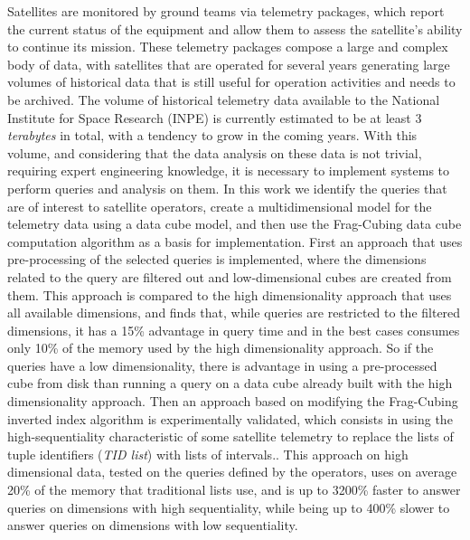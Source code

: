 
\begin{resumo}

\hypertarget{estilo:resumo}{} %

Satellites are monitored by ground teams via telemetry packages, which report the current status of the equipment and allow them to assess the satellite's ability to continue its mission.
These telemetry packages compose a large and complex body of data, with satellites that are operated for several years generating large volumes of historical data that is still useful for operation activities and needs to be archived.
The volume of historical telemetry data available to the National Institute for Space Research (INPE) is currently estimated to be at least 3 \textit{terabytes} in total, with a tendency to grow in the coming years.
With this volume, and considering that the data analysis on these data is not trivial, requiring expert engineering knowledge, it is necessary to implement systems to perform queries and analysis on them.
In this work we identify the queries that are of interest to satellite operators, create a multidimensional model for the telemetry data using a data cube model, and then use the Frag-Cubing data cube computation algorithm as a basis for implementation.
First an approach that uses pre-processing of the selected queries is implemented, where the dimensions related to the query are filtered out and low-dimensional cubes are created from them.
This approach is compared to the high dimensionality approach that uses all available dimensions, and finds that, while queries are restricted to the filtered dimensions, it has a 15\% advantage in query time and in the best cases consumes only 10\% of the memory used by the high dimensionality approach.
So if the queries have a low dimensionality, there is advantage in using a pre-processed cube from disk than running a query on a data cube already built with the high dimensionality approach.
Then an approach based on modifying the Frag-Cubing inverted index algorithm is experimentally validated, which consists in using the high-sequentiality characteristic of some satellite telemetry to replace the lists of tuple identifiers (\textit{TID list}) with lists of intervals..
This approach on high dimensional data, tested on the queries defined by the operators, uses on average 20\% of the memory that traditional lists use, and is up to 3200\% faster to answer queries on dimensions with high sequentiality, while being up to 400\% slower to answer queries on dimensions with low sequentiality.


\end{resumo}
